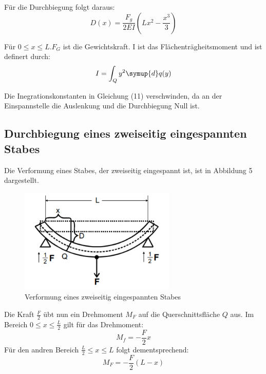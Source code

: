 

Für die Durchbiegung folgt daraus:
\begin{equation}
  D(x) = \frac{F_g}{2EI} \left(Lx^2 - \frac{x^3}{3} \right)
\end{equation}

Für $0 \leq x \leq L$.$F_G$ ist die Gewichtskraft. I ist das Flächenträgheitsmoment und ist definert durch:
\begin{equation}
  I = \int_Q y^2 \symup{d}q(y)
\end{equation}

Die Inegrationskonstanten in Gleichung (11) verschwinden, da an der Einspannstelle
die Auslenkung und die Durchbiegung Null ist.

\subsection{Durchbiegung eines zweiseitig eingespannten Stabes}
Die Verformung eines Stabes, der zweiseitig eingespannt ist, ist in Abbildung 5
dargestellt.

\begin{figure}[H]
  \centering
  \includegraphics[height=5cm]{zweiseitig.PNG}
  \caption{Verformung eines zweiseitig eingespannten Stabes}
  \label{fig:zweiseitig}
\end{figure}

Die Kraft $\frac{F}{2}$ übt nun ein Drehmoment $M_F$ auf die Querschnittsfläche $Q$ aus.
Im Bereich $0 \leq x \leq \frac{L}{2}$ gilt für das Drehmoment:
\begin{equation}
  M_f = -\frac{F}{2}x
\end{equation}
Für den andren Bereich $\frac{L}{2} \leq x \leq L$ folgt dementsprechend:
\begin{equation}
  M_F = -\frac{F}{2}(L - x)
\end{equation}

